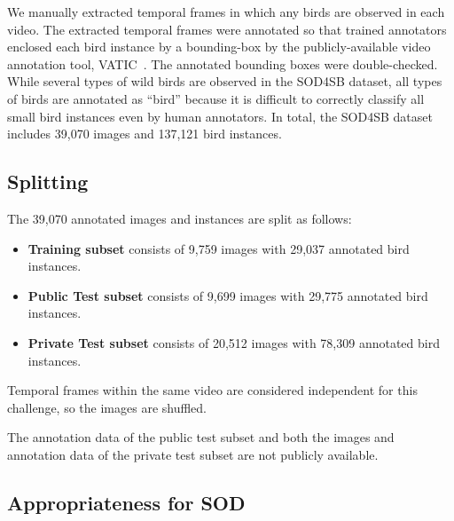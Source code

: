 \documentclass{mva_style}
\begin{document}
We manually extracted temporal frames in which any birds are observed in each video.
The extracted temporal frames were annotated so that trained annotators enclosed each bird instance by a bounding-box by the publicly-available video annotation tool, VATIC~\cite{vondrick2013efficiently}.
The annotated bounding boxes were double-checked. 
While several types of wild birds are observed in the SOD4SB dataset, all types of birds are annotated as ``bird'' because it is difficult to correctly classify all small bird instances even by human annotators.
In total, the SOD4SB dataset includes 39,070 images and 137,121 bird instances.

\subsection{Splitting}

The 39,070 annotated images and instances are split as follows:
\begin{itemize}
      \item \textbf{Training subset} consists of 9,759 images with 29,037 annotated bird instances.  
      \item \textbf{Public Test subset} consists of 9,699 images with 29,775 annotated bird instances.  
      \item \textbf{Private Test subset} consists of 20,512 images with 78,309 annotated bird instances. 
\end{itemize}
Temporal frames within the same video are considered independent for this challenge, so the images are shuffled.

The annotation data of the public test subset and both the images and annotation data of the private test subset are not publicly available.


\subsection{Appropriateness for SOD}\label{subsub:appropriateness4sod}
\end{document}
